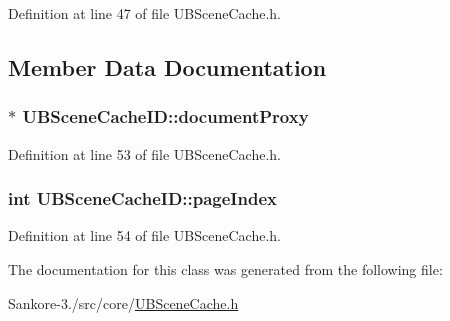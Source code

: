 Definition at line 47 of file U\-B\-Scene\-Cache.\-h.



\subsection{Member Data Documentation}
\hypertarget{class_u_b_scene_cache_i_d_a4b8cea433ac8fe75ca3cef342e628e73}{
\subsubsection[{document\-Proxy}]{$\ast$ U\-B\-Scene\-Cache\-I\-D\-::document\-Proxy}}\label{dc/d7c/class_u_b_scene_cache_i_d_a4b8cea433ac8fe75ca3cef342e628e73}


Definition at line 53 of file U\-B\-Scene\-Cache.\-h.

\hypertarget{class_u_b_scene_cache_i_d_a217f4cf4db2f7574c2abadecdd85fec4}{
\subsubsection[{page\-Index}]{\setlength{\rightskip}{0pt plus 5cm}int U\-B\-Scene\-Cache\-I\-D\-::page\-Index}}\label{dc/d7c/class_u_b_scene_cache_i_d_a217f4cf4db2f7574c2abadecdd85fec4}


Definition at line 54 of file U\-B\-Scene\-Cache.\-h.



The documentation for this class was generated from the following file\-:\begin{DoxyCompactItemize}
\item 
Sankore-\/3./src/core/\hyperlink{_u_b_scene_cache_8h}{U\-B\-Scene\-Cache.\-h}\end{DoxyCompactItemize}
